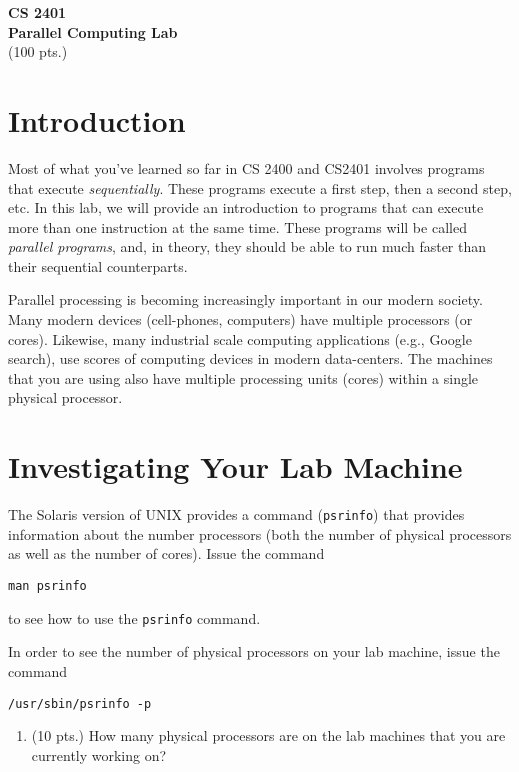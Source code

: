 \documentclass[12pt]{article}
\begin{document}
\begin{center}
{\Large \bf CS 2401} \\
{\Large \bf Parallel Computing Lab} \\
(100 pts.)
\end{center}

\section*{Introduction}
Most of what you've learned so far in CS 2400 and CS2401 involves
programs that execute \emph{sequentially}.  These programs execute a first step, then a second step, etc.   In this lab, we will provide an introduction to programs that can execute more than one instruction at the same time.  These programs will be called \emph{parallel programs}, and, in theory, they should be 
able to run much faster than their sequential counterparts.

Parallel processing is becoming increasingly important in our modern society.  Many modern devices (cell-phones, computers) have multiple processors 
(or cores).  Likewise, many industrial scale computing 
applications (e.g., Google search), use scores of computing 
devices in modern data-centers.  The machines that you are using also have
multiple processing units (cores) within a single physical processor.

\section*{Investigating Your Lab Machine}
The Solaris version of UNIX provides a command (\verb+psrinfo+) 
that provides information about the number processors (both the number
of physical processors as well as the number of cores).  Issue the command
\begin{verbatim}
man psrinfo 
\end{verbatim}
to see how to use the \verb+psrinfo+ command.

In order to see the number of physical processors on your lab
machine, issue the command
\begin{verbatim}
/usr/sbin/psrinfo -p
\end{verbatim}

\begin{enumerate}
\item (10 pts.)  How many physical processors are on the lab machines that you are currently working on?
\end{enumerate}
\end{document}
